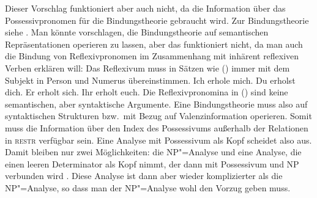 \noindent
Dieser Vorschlag funktioniert aber auch nicht, da die Information über das Possessivpronomen
für die Bindungstheorie gebraucht wird. Zur Bindungstheorie siehe
. Man könnte vorschlagen, die Bindungstheorie auf semantischen Repräsentationen
operieren zu lassen, aber das funktioniert nicht, da man auch die Bindung von Reflexivpronomen
im Zusammenhang mit inhärent reflexiven Verben erklären will:
Das Reflexivum muss in Sätzen wie () immer mit dem Subjekt in Person und Numerus übereinstimmen.
\eal
\ex Ich erhole mich.
\ex Du erholst dich.
\ex Er erholt sich.
\ex Ihr erholt euch.
\zl
Die Reflexivpronomina in () sind keine semantischen, aber syntaktische Argumente.
Eine Bindungstheorie muss also auf syntaktischen Strukturen bzw.\ mit Bezug auf Valenzinformation
operieren. Somit muss die Information über den Index des Possessivums außerhalb der Relationen
in \textsc{restr} verfügbar sein. 
Eine Analyse mit Possessivum als Kopf scheidet also aus. Damit bleiben
nur zwei Möglichkeiten: die NP"=Analyse und eine Analyse, die einen leeren Determinator als Kopf
nimmt, der dann mit Possessivum und NP verbunden wird \citep[, ]{Abney87a}.
Diese Analyse ist dann aber wieder komplizierter
als die NP"=Analyse, so dass man der NP"=Analyse wohl den Vorzug geben muss.


